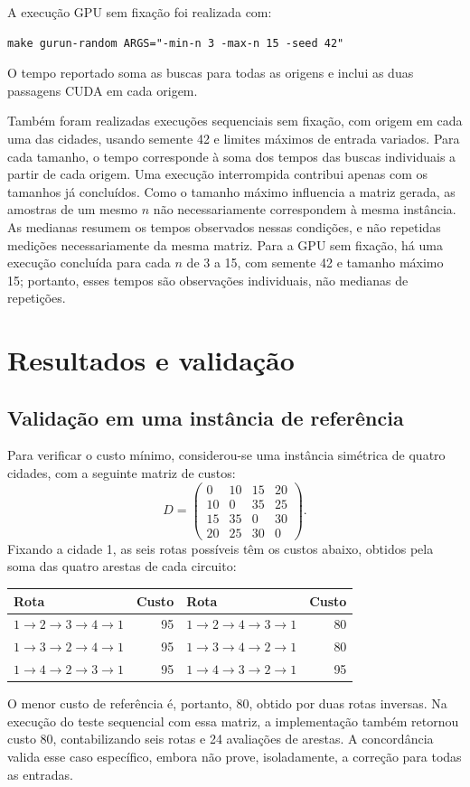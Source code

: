 \documentclass[12pt,a4paper]{article}
\begin{document}
A execução GPU sem fixação foi realizada com:
\begin{verbatim}
make gurun-random ARGS="-min-n 3 -max-n 15 -seed 42"
\end{verbatim}
O tempo reportado soma as buscas para todas as origens e inclui as duas passagens CUDA em cada origem.

Também foram realizadas execuções sequenciais sem fixação, com origem em cada uma das cidades, usando semente 42 e limites máximos de entrada variados. Para cada tamanho, o tempo corresponde à soma dos tempos das buscas individuais a partir de cada origem. Uma execução interrompida contribui apenas com os tamanhos já concluídos. Como o tamanho máximo influencia a matriz gerada, as amostras de um mesmo $n$ não necessariamente correspondem à mesma instância. As medianas resumem os tempos observados nessas condições, e não repetidas medições necessariamente da mesma matriz. Para a GPU sem fixação, há uma execução concluída para cada $n$ de 3 a 15, com semente 42 e tamanho máximo 15; portanto, esses tempos são observações individuais, não medianas de repetições.

\section{Resultados e validação}

\subsection{Validação em uma instância de referência}

Para verificar o custo mínimo, considerou-se uma instância simétrica de quatro cidades, com a seguinte matriz de custos:
\[
D=\begin{pmatrix}
0 & 10 & 15 & 20\\
10 & 0 & 35 & 25\\
15 & 35 & 0 & 30\\
20 & 25 & 30 & 0
\end{pmatrix}.
\]
Fixando a cidade 1, as seis rotas possíveis têm os custos abaixo, obtidos pela soma das quatro arestas de cada circuito:
\begin{center}
\begin{tabular}{lr@{\qquad}lr}
\toprule
Rota & Custo & Rota & Custo \\
\midrule
$1\to2\to3\to4\to1$ & 95 & $1\to2\to4\to3\to1$ & 80 \\
$1\to3\to2\to4\to1$ & 95 & $1\to3\to4\to2\to1$ & 80 \\
$1\to4\to2\to3\to1$ & 95 & $1\to4\to3\to2\to1$ & 95 \\
\bottomrule
\end{tabular}
\end{center}
O menor custo de referência é, portanto, 80, obtido por duas rotas inversas. Na execução do teste sequencial com essa matriz, a implementação também retornou custo 80, contabilizando seis rotas e 24 avaliações de arestas. A concordância valida esse caso específico, embora não prove, isoladamente, a correção para todas as entradas.
\end{document}
